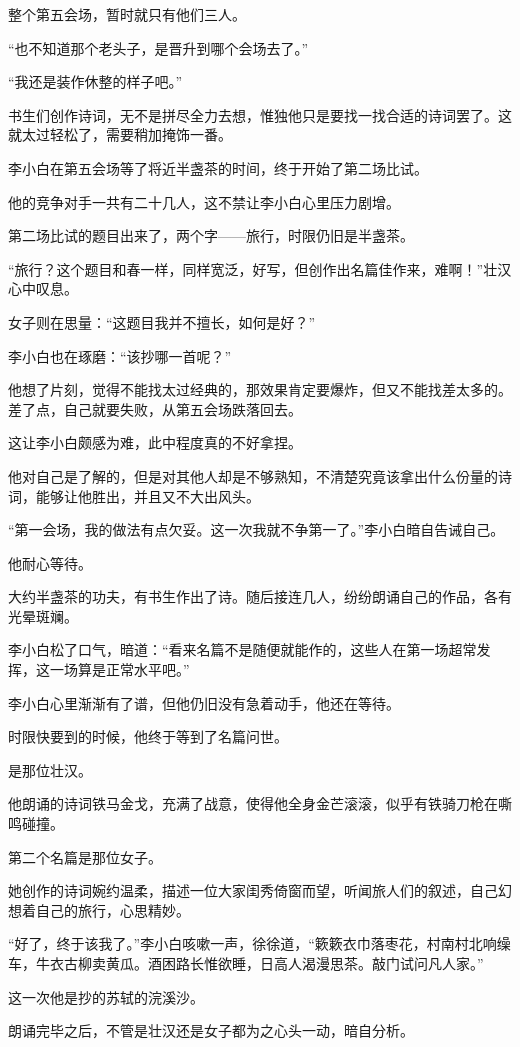 \begin{this_body}
整个第五会场，暂时就只有他们三人。

“也不知道那个老头子，是晋升到哪个会场去了。”

“我还是装作休整的样子吧。”

书生们创作诗词，无不是拼尽全力去想，惟独他只是要找一找合适的诗词罢了。这就太过轻松了，需要稍加掩饰一番。

李小白在第五会场等了将近半盏茶的时间，终于开始了第二场比试。

他的竞争对手一共有二十几人，这不禁让李小白心里压力剧增。

第二场比试的题目出来了，两个字——旅行，时限仍旧是半盏茶。

“旅行？这个题目和春一样，同样宽泛，好写，但创作出名篇佳作来，难啊！”壮汉心中叹息。

女子则在思量：“这题目我并不擅长，如何是好？”

李小白也在琢磨：“该抄哪一首呢？”

他想了片刻，觉得不能找太过经典的，那效果肯定要爆炸，但又不能找差太多的。差了点，自己就要失败，从第五会场跌落回去。

这让李小白颇感为难，此中程度真的不好拿捏。

他对自己是了解的，但是对其他人却是不够熟知，不清楚究竟该拿出什么份量的诗词，能够让他胜出，并且又不大出风头。

“第一会场，我的做法有点欠妥。这一次我就不争第一了。”李小白暗自告诫自己。

他耐心等待。

大约半盏茶的功夫，有书生作出了诗。随后接连几人，纷纷朗诵自己的作品，各有光晕斑斓。

李小白松了口气，暗道：“看来名篇不是随便就能作的，这些人在第一场超常发挥，这一场算是正常水平吧。”

李小白心里渐渐有了谱，但他仍旧没有急着动手，他还在等待。

时限快要到的时候，他终于等到了名篇问世。

是那位壮汉。

他朗诵的诗词铁马金戈，充满了战意，使得他全身金芒滚滚，似乎有铁骑刀枪在嘶鸣碰撞。

第二个名篇是那位女子。

她创作的诗词婉约温柔，描述一位大家闺秀倚窗而望，听闻旅人们的叙述，自己幻想着自己的旅行，心思精妙。

“好了，终于该我了。”李小白咳嗽一声，徐徐道，“簌簌衣巾落枣花，村南村北响缲车，牛衣古柳卖黄瓜。酒困路长惟欲睡，日高人渴漫思茶。敲门试问凡人家。”

这一次他是抄的苏轼的浣溪沙。

朗诵完毕之后，不管是壮汉还是女子都为之心头一动，暗自分析。


\end{this_body}
